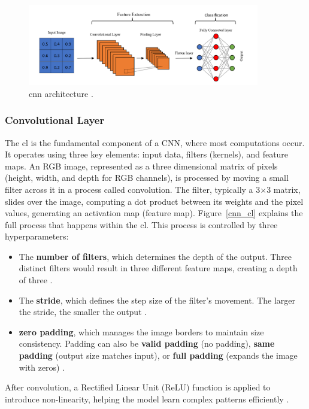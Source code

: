 \begin{figure}[ht]
    \centering
    \includegraphics[width=0.9\textwidth]{Figures/Full_cnn.PNG} 
    \caption{\gls{cnn} architecture \cite{Full_CNN}.}
    \label{full_cnn}
\end{figure}

\subsubsection{Convolutional Layer}
The \gls{cl} is the fundamental component of a CNN, where most computations occur. It operates using three key elements: input data, filters (kernels), and feature maps. An RGB image, represented as a three dimensional matrix of pixels (height, width, and depth for RGB channels), is processed by moving a small filter across it in a process called convolution. The filter, typically a 3×3 matrix, slides over the image, computing a dot product between its weights and the pixel values, generating an activation map (feature map). Figure~\ref{cnn_cl} explains the full process that happens within the \gls{cl}. This process is controlled by three hyperparameters:
\begin{itemize}
    \item The \textbf{number of filters}, which determines the depth of the output. Three distinct filters would result in three different feature maps, creating a depth of three \cite{ibm_cnn}.
    \item The \textbf{stride}, which defines the step size of the filter's movement. The larger the stride, the smaller the output \cite{ibm_cnn}.
    \item \textbf{zero padding}, which manages the image borders to maintain size consistency. Padding can also be \textbf{valid padding} (no padding), \textbf{same padding} (output size matches input), or \textbf{full padding} (expands the image with zeros) \cite{ibm_cnn}.
\end{itemize}   
After convolution, a Rectified Linear Unit (ReLU) function is applied to introduce non-linearity, helping the model learn complex patterns efficiently \cite{ibm_cnn}.

